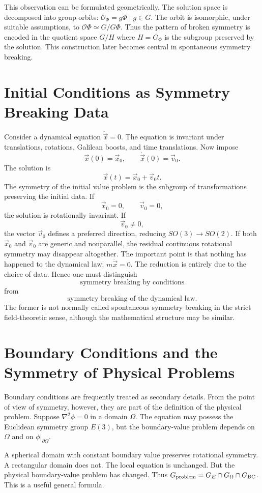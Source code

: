 This observation can be formulated geometrically.  The solution space is
decomposed into group orbits: $\mathcal{O}_\Phi={g\Phi\mid g\in G}$.
The orbit is isomorphic, under suitable assumptions, to
$\mathcal{O} \Phi\simeq G/G \Phi$.
Thus the pattern of broken symmetry is encoded in the quotient space
$G/H$ where $H=G_\Phi$ is the subgroup preserved by the solution.
This construction later becomes central in spontaneous symmetry breaking.

\section{ Initial Conditions as Symmetry Breaking Data}
Consider a dynamical equation $\ddot{\vec{x}}=0$.
The equation is invariant under translations, rotations, Galilean boosts, and
time translations. Now impose
\[\vec{x}(0)=\vec{x}_0,\qquad\dot{\vec{x}}(0)=\vec{v}_0.\]
The solution is
\[\vec{x}(t)=\vec{x}_0+\vec{v}_0t.\]
The symmetry of the initial value problem is the subgroup of transformations
preserving the initial data.
If
\[\vec{x}_0=0,\qquad\vec{v}_0=0,\]
the solution is rotationally invariant.
If
\[\vec{v}_0\neq0,\]
the vector $\vec{v}_0$ defines a preferred direction, reducing
$SO(3)\rightarrow SO(2)$.
If both $\vec{x}_0$ and $\vec{v}_0$ are generic and nonparallel, the residual 
continuous rotational symmetry may disappear altogether.
The important point is that nothing has happened to the dynamical law:
$m\ddot{\vec{x}}=0$.
The reduction is entirely due to the choice of data.
Hence one must distinguish
\[\boxed{\text{symmetry breaking by conditions}}\]
from
\[\boxed{\text{symmetry breaking of the dynamical law}.}\]
The former is not normally called spontaneous symmetry breaking in the strict
field-theoretic sense, although the mathematical structure may be similar.

\section{Boundary Conditions and the Symmetry of Physical Problems}
Boundary conditions are frequently treated as secondary details.  From the
point of view of symmetry, however, they are part of the definition of the
physical problem.
Suppose $\nabla^2\phi=0$ in a domain $\Omega$.
The equation may possess the Euclidean symmetry group $E(3)$, but the
boundary-value problem depends on $\Omega$ and on $\phi|_{\partial\Omega}$.

A spherical domain with constant boundary value preserves rotational symmetry.
A rectangular domain does not.
The local equation is unchanged.
But the physical boundary-value problem has changed.
Thus $G_{\rm problem}=G_E\cap G_\Omega\cap G_{\rm BC}$.
This is a useful general formula.

